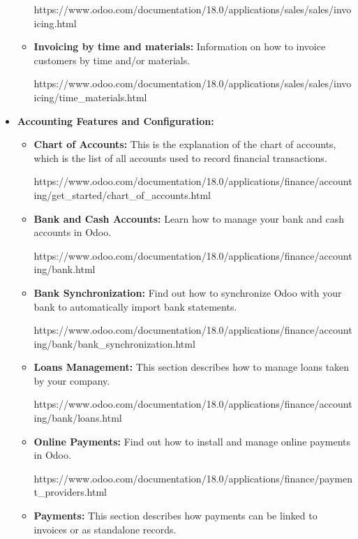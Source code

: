 \documentclass[11pt,a4paper]{article}
\begin{document}
\begin{itemize}
\begin{itemize}
        https://www.odoo.com/documentation/18.0/applications/sales/sales/invoicing.html
	
        \item \textbf{Invoicing by time and materials:} Information on how to invoice customers by time and/or materials. 
        
        https://www.odoo.com/documentation/18.0/applications/sales/sales/invoicing/time\_materials.html
    \end{itemize}
    \item \textbf{Accounting Features and Configuration:}
    \begin{itemize}
        \item \textbf{Chart of Accounts:} This is the explanation of the chart of accounts, which is the list of all accounts used to record financial transactions. 
        
        https://www.odoo.com/documentation/18.0/applications/finance/accounting/get\_started/chart\_of\_accounts.html

        \item \textbf{Bank and Cash Accounts:} Learn how to manage your bank and cash accounts in Odoo. 
        
        https://www.odoo.com/documentation/18.0/applications/finance/accounting/bank.html

        \item \textbf{Bank Synchronization:} Find out how to synchronize Odoo with your bank to automatically import bank statements. 
        
        https://www.odoo.com/documentation/18.0/applications/finance/accounting/bank/bank\_synchronization.html

        \item \textbf{Loans Management:} This section describes how to manage loans taken by your company. 
        
        https://www.odoo.com/documentation/18.0/applications/finance/accounting/bank/loans.html

        \item \textbf{Online Payments:} Find out how to install and manage online payments in Odoo. 
        
        https://www.odoo.com/documentation/18.0/applications/finance/payment\_providers.html

        \item \textbf{Payments:} This section describes how payments can be linked to invoices or as standalone records. 
        

\end{itemize}
\end{itemize}
\end{document}
